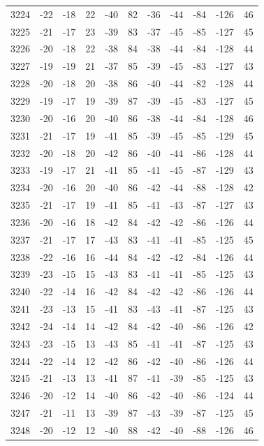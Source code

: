 \begin{table}[H]
\begin{tabular}{lllllllllll}
3224 & -22 & -18 & 22 & -40 & 82 & -36 & -44 & -84 & -126 & 46 \\
3225 & -21 & -17 & 23 & -39 & 83 & -37 & -45 & -85 & -127 & 45 \\
3226 & -20 & -18 & 22 & -38 & 84 & -38 & -44 & -84 & -128 & 44 \\
3227 & -19 & -19 & 21 & -37 & 85 & -39 & -45 & -83 & -127 & 43 \\
3228 & -20 & -18 & 20 & -38 & 86 & -40 & -44 & -82 & -128 & 44 \\
3229 & -19 & -17 & 19 & -39 & 87 & -39 & -45 & -83 & -127 & 45 \\
3230 & -20 & -16 & 20 & -40 & 86 & -38 & -44 & -84 & -128 & 46 \\
3231 & -21 & -17 & 19 & -41 & 85 & -39 & -45 & -85 & -129 & 45 \\
3232 & -20 & -18 & 20 & -42 & 86 & -40 & -44 & -86 & -128 & 44 \\
3233 & -19 & -17 & 21 & -41 & 85 & -41 & -45 & -87 & -129 & 43 \\
3234 & -20 & -16 & 20 & -40 & 86 & -42 & -44 & -88 & -128 & 42 \\
3235 & -21 & -17 & 19 & -41 & 85 & -41 & -43 & -87 & -127 & 43 \\
3236 & -20 & -16 & 18 & -42 & 84 & -42 & -42 & -86 & -126 & 44 \\
3237 & -21 & -17 & 17 & -43 & 83 & -41 & -41 & -85 & -125 & 45 \\
3238 & -22 & -16 & 16 & -44 & 84 & -42 & -42 & -84 & -126 & 44 \\
3239 & -23 & -15 & 15 & -43 & 83 & -41 & -41 & -85 & -125 & 43 \\
3240 & -22 & -14 & 16 & -42 & 84 & -42 & -42 & -86 & -126 & 44 \\
3241 & -23 & -13 & 15 & -41 & 83 & -43 & -41 & -87 & -125 & 43 \\
3242 & -24 & -14 & 14 & -42 & 84 & -42 & -40 & -86 & -126 & 42 \\
3243 & -23 & -15 & 13 & -43 & 85 & -41 & -41 & -87 & -125 & 43 \\
3244 & -22 & -14 & 12 & -42 & 86 & -42 & -40 & -86 & -126 & 44 \\
3245 & -21 & -13 & 13 & -41 & 87 & -41 & -39 & -85 & -125 & 43 \\
3246 & -20 & -12 & 14 & -40 & 86 & -42 & -40 & -86 & -124 & 44 \\
3247 & -21 & -11 & 13 & -39 & 87 & -43 & -39 & -87 & -125 & 45 \\
3248 & -20 & -12 & 12 & -40 & 88 & -42 & -40 & -88 & -126 & 46 \\

\end{tabular}
\end{table}
